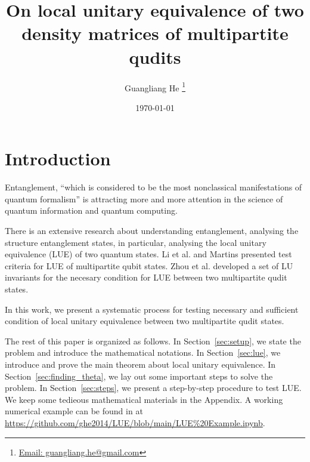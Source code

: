 \documentclass{article}
\title{On local unitary equivalence of two density matrices of multipartite qudits}
\author{Guangliang He
  \thanks{\href{mailto:guangliang.he@gmail.com}
    {Email: guangliang.he@gmail.com}}}
\date{\today}
\begin{document}
\maketitle

\section{Introduction}
Entanglement, ``which is considered to be the most nonclassical
manifestations of quantum formalism''\cite{Horodecki_2009}
is attracting more and more attention in the science of quantum
information and quantum computing.

There is an extensive research about understanding entanglement,
analysing the structure entanglement states, in particular,
analysing the local unitary equivalence (LUE) of two quantum states.
Li et al.\cite{Li_2014} and Martins\cite{Martins_2015} presented
test criteria for LUE of multipartite qubit states.
Zhou et al.\cite{Zhou_2024} developed a set of LU invariants for
the necesary condition for LUE between two multipartite qudit states.

In this work, we present a systematic process for testing
necessary and sufficient condition of local unitary equivalence
between two multipartite qudit states.

The rest of this paper is organized as follows. In
Section~\ref{sec:setup}, we state the problem and introduce the
mathematical notations.  In Section~\ref{sec:lue}, we introduce
and prove the main theorem about local unitary equivalence.
In Section~\ref{sec:finding_theta}, we lay out some important
steps to solve the problem.  In Section~\ref{sec:steps}, we
present a step-by-step procedure to test LUE.  We keep some
tedieous mathematical materials in the Appendix.  A working
numerical example can be found in at \href{https://github.com/ghe2014/LUE/blob/main/LUE\%20Example.ipynb}{https://github.com/ghe2014/LUE/blob/main/LUE\%20Example.ipynb}.
\end{document}
